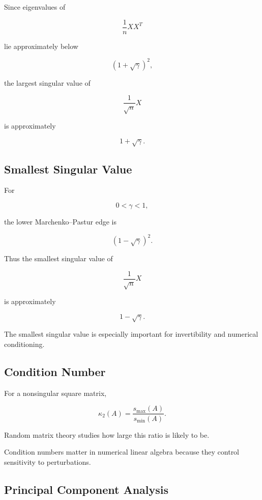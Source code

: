 Since eigenvalues of

\[
\frac1nXX^T
\]

lie approximately below

\[
(1+\sqrt{\gamma})^2,
\]

the largest singular value of

\[
\frac1{\sqrt{n}}X
\]

is approximately

\[
\boxed{
1+\sqrt{\gamma}.
}
\]

\subsection{Smallest Singular Value}
\label{subsec:smallest-singular-value}

For

\[
0<\gamma<1,
\]

the lower Marchenko--Pastur edge is

\[
(1-\sqrt{\gamma})^2.
\]

Thus the smallest singular value of

\[
\frac1{\sqrt{n}}X
\]

is approximately

\[
\boxed{
1-\sqrt{\gamma}.
}
\]

The smallest singular value is especially important for invertibility
and numerical conditioning.

\subsection{Condition Number}
\label{subsec:random-condition-number}

For a nonsingular square matrix,

\[
\boxed{
\kappa_2(A)
=
\frac{
s_{\max}(A)
}{
s_{\min}(A)
}.
}
\]

Random matrix theory studies how large this ratio is likely to be.

Condition numbers matter in numerical linear algebra because they
control sensitivity to perturbations.

\subsection{Principal Component Analysis}
\label{subsec:rmt-pca}

